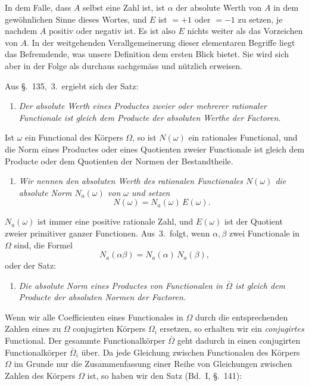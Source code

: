 \documentclass[12pt,a4paper]{article}
\theoremstyle{definition}
\begin{document}
In dem Falle, dass $A$ selbst eine Zahl ist, ist $\alpha$ der absolute Werth von $A$ in dem gewöhnlichen Sinne dieses Wortes, und $E$ ist $=+1$ oder $=-1$ zu setzen, je nachdem $A$ positiv oder negativ ist. Es ist also $E$ nichts weiter als das Vorzeichen von $A$. In der weitgehenden Verallgemeinerung dieser elementaren Begriffe liegt das Befremdende, was unsere Definition dem ersten Blick bietet. Sie wird sich aber in der Folge als durchaus sachgemäss und nützlich erweisen.

Aus \S.~135,~3.\ ergiebt sich der Satz:

\begin{enumerate}[label=\arabic*., resume]
\item \textit{Der absolute Werth eines Productes zweier oder mehrerer rationaler Functionale ist gleich dem Producte der absoluten Werthe der Factoren.}
\end{enumerate}

Ist $\omega$ ein Functional des Körpers $\Omega$, so ist $N(\omega)$ ein rationales Functional, und die Norm eines Productes oder eines Quotienten zweier Functionale ist gleich dem Producte oder dem Quotienten der Normen der Bestandtheile.

\begin{enumerate}[label=\arabic*., resume]
\item \textit{Wir nennen den absoluten Werth des rationalen Functionales $N(\omega)$ die \emph{absolute Norm} $N_a(\omega)$ von $\omega$ und setzen}
\begin{equation}\label{eq:136-3}
N(\omega) = N_a(\omega)\,E(\omega).
\end{equation}
\end{enumerate}

$N_a(\omega)$ ist immer eine positive rationale Zahl, und $E(\omega)$ ist der Quotient zweier primitiver ganzer Functionen. Aus~3.\ folgt, wenn $\alpha,\beta$ zwei Functionale in $\Omega$ sind, die Formel
\begin{equation}\label{eq:136-4}
N_a(\alpha\beta) = N_a(\alpha)\,N_a(\beta),
\end{equation}
oder der Satz:

\begin{enumerate}[label=\arabic*., resume]
\item \textit{Die absolute Norm eines Productes von Functionalen in $\bar{\Omega}$ ist gleich dem Producte der absoluten Normen der Factoren.}
\end{enumerate}

Wenn wir alle Coefficienten eines Functionales in $\Omega$ durch die entsprechenden Zahlen eines zu $\Omega$ conjugirten Körpers $\Omega_i$ ersetzen, so erhalten wir ein \emph{conjugirtes} Functional. Der gesammte Functionalkörper $\bar{\Omega}$ geht dadurch in einen conjugirten Functionalkörper $\bar{\Omega}_i$ über. Da jede Gleichung zwischen Functionalen des Körpers $\Omega$ im Grunde nur die Zusammenfassung einer Reihe von Gleichungen zwischen Zahlen des Körpers $\Omega$ ist, so haben wir den Satz (Bd.~I, \S.~141):
\end{document}
